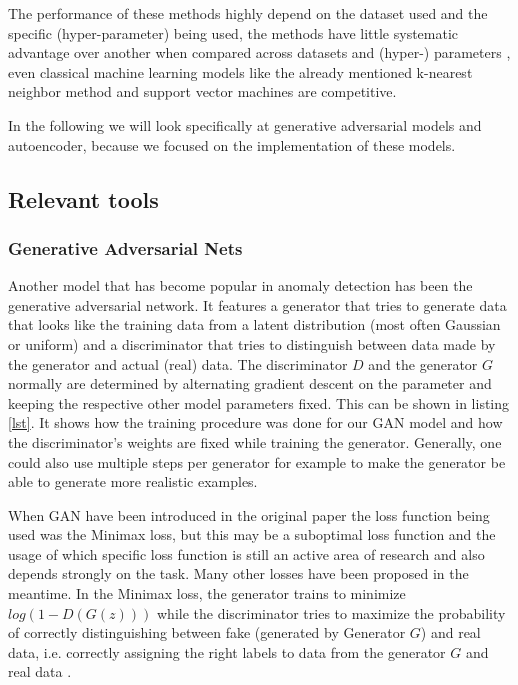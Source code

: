 \documentclass[]{article}
\begin{document}
	 \noindent
	 The performance of these methods highly depend on the dataset used and the specific (hyper-parameter) being used, the methods have little systematic advantage over another when compared across datasets and (hyper-) parameters \cite{xxxx}, even classical machine learning models like the already mentioned k-nearest neighbor method and support vector machines are competitive. 
	 \newline
	 
	 \noindent
	 In the following we will look specifically at generative adversarial models and autoencoder, because we focused on the implementation of these models. 
	
	 
	 \subsection{Relevant tools}
	 \subsubsection{Generative Adversarial Nets}
	 Another model that has become popular in anomaly detection has been the generative adversarial network. It features a generator that tries to generate data that looks like the training data from a latent distribution (most often Gaussian or uniform) and a discriminator that tries to distinguish between data made by the generator and actual (real) data. The discriminator $D$ and the generator $G$ normally are determined by alternating gradient descent on the parameter and keeping the respective other model parameters fixed. This can be shown in listing \ref{lst}. It shows how the training procedure was done for our GAN model and how the discriminator's weights are fixed while training the generator. Generally, one could also use multiple steps per generator for example to make the generator be able to generate more realistic examples. 
	 \newline
	 
	 \noindent
	 When GAN have been introduced in the original paper the loss function being used was the Minimax loss, but this may be a suboptimal loss function and the usage of which specific loss function is still an active area of research and also depends strongly on the task. Many other losses have been proposed in the meantime. In the Minimax loss, the generator trains to minimize $log(1-D(G(z)))$ while the discriminator tries to maximize the probability of correctly distinguishing between fake (generated by Generator $G$) and real data, i.e. correctly assigning the right labels to data from the generator $G$ and real data \cite{https://doi.org/10.48550/arxiv.1406.2661}. 
	 
\end{document}

